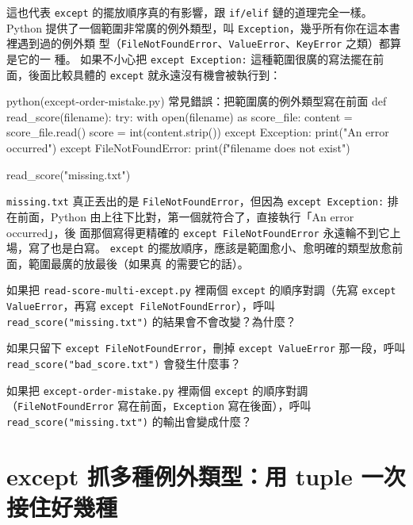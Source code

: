 這也代表 \texttt{except} 的擺放順序真的有影響，跟 \texttt{if/elif} 鏈的道理完全一樣。Python
提供了一個範圍非常廣的例外類型，叫 \texttt{Exception}，幾乎所有你在這本書裡遇到過的例外類
型（\texttt{FileNotFoundError}、\texttt{ValueError}、\texttt{KeyError} 之類）都算是它的一
種。
如果不小心把 \texttt{except Exception:} 這種範圍很廣的寫法擺在前面，後面比較具體的
\texttt{except} 就永遠沒有機會被執行到：

\begin{example}{python}{(except-order-mistake.py) 常見錯誤：把範圍廣的例外類型寫在前面}
def read_score(filename):
    try:
        with open(filename) as score_file:
            content = score_file.read()
        score = int(content.strip())
    except Exception:
        print("An error occurred")
    except FileNotFoundError:
        print(f"{filename} does not exist")

read_score("missing.txt")
\end{example}


\texttt{missing.txt} 真正丟出的是 \texttt{FileNotFoundError}，但因為 \texttt{except
Exception:} 排在前面，Python 由上往下比對，第一個就符合了，直接執行「An error occurred」，後
面那個寫得更精確的 \texttt{except FileNotFoundError} 永遠輪不到它上場，寫了也是白寫。
\texttt{except} 的擺放順序，應該是範圍愈小、愈明確的類型放愈前面，範圍最廣的放最後（如果真
的需要它的話）。

\begin{drills}[label=drills:multiple-except]
\item 如果把 \texttt{read-score-multi-except.py} 裡兩個 \texttt{except} 的順序對調（先寫
\texttt{except ValueError}，再寫 \texttt{except FileNotFoundError}），呼叫
\texttt{read\_score("missing.txt")} 的結果會不會改變？為什麼？
\item 如果只留下 \texttt{except FileNotFoundError}，刪掉 \texttt{except ValueError}
那一段，呼叫 \texttt{read\_score("bad\_score.txt")} 會發生什麼事？
\item 如果把 \texttt{except-order-mistake.py} 裡兩個 \texttt{except} 的順序對調
（\texttt{FileNotFoundError} 寫在前面，\texttt{Exception} 寫在後面），呼叫
\texttt{read\_score("missing.txt")} 的輸出會變成什麼？
\end{drills}

\section{except 抓多種例外類型：用 tuple 一次接住好幾種}
\label{sec:except-tuple}

